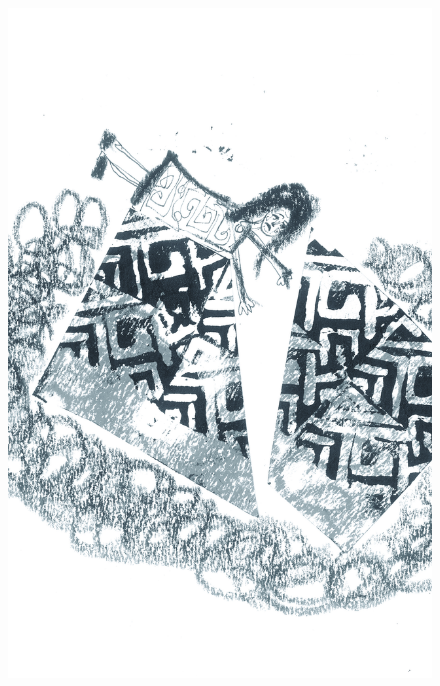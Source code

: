 \pagebreak
\thispagestyle{empty}
\begin{figure}
\vspace*{-1.6cm}
\hspace*{-2.2cm}\includegraphics[width=138mm]{./imgs/img7.jpg}
\end{figure}

\chapter*{}

\mbox{}\vspace*{\fill}

